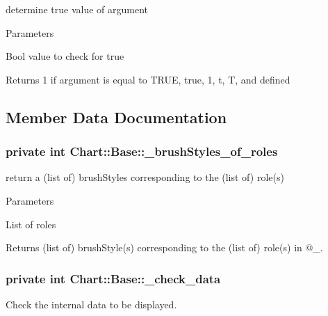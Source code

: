 determine true value of argument 


\begin{DoxyParams}{Parameters}
\item[\mbox{\tt[in]} {\em \$b}]Bool value to check for true \end{DoxyParams}
\begin{DoxyReturn}{Returns}
1 if argument is equal to TRUE, true, 1, t, T, and defined 
\end{DoxyReturn}


\subsection{Member Data Documentation}
\hypertarget{classChart_1_1Base_a2c02f66668131d6567338965e821d87a}{
\subsubsection[{\_\-brushStyles\_\-of\_\-roles}]{\setlength{\rightskip}{0pt plus 5cm}private int {\bf Chart::Base::\_\-brushStyles\_\-of\_\-roles}}}
\label{classChart_1_1Base_a2c02f66668131d6567338965e821d87a}


return a (list of) brushStyles corresponding to the (list of) role(s) 


\begin{DoxyParams}{Parameters}
\item[{\em $\backslash$@list\_\-of\_\-roles}]List of roles \end{DoxyParams}
\begin{DoxyReturn}{Returns}
(list of) brushStyle(s) corresponding to the (list of) role(s) in @\_\-. 
\end{DoxyReturn}
\hypertarget{classChart_1_1Base_a13296be5b92a9880851977fe0abfdf01}{
\subsubsection[{\_\-check\_\-data}]{\setlength{\rightskip}{0pt plus 5cm}private int {\bf Chart::Base::\_\-check\_\-data}}}
\label{classChart_1_1Base_a13296be5b92a9880851977fe0abfdf01}


Check the internal data to be displayed. 

